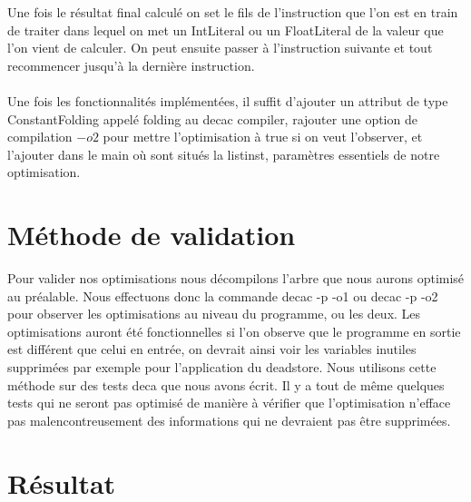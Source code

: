 \documentclass[a4paper]{article}
\begin{document}
Une fois le résultat final calculé on set le fils de l'instruction que l'on est en train de traiter dans lequel on met un IntLiteral ou un FloatLiteral de la valeur que l'on vient de calculer. On peut ensuite passer à l'instruction suivante et tout recommencer jusqu'à la dernière instruction.\\ \\
Une fois les fonctionnalités implémentées, il suffit d'ajouter un attribut de type ConstantFolding appelé folding au decac compiler, rajouter une option de compilation $-o2$ pour mettre l'optimisation à true si on veut l'observer, et l'ajouter dans le main où sont situés la listinst, paramètres essentiels de notre optimisation.

\section{Méthode de validation}
Pour valider nos optimisations nous décompilons l'arbre que nous aurons optimisé au préalable. Nous effectuons donc la commande decac -p -o1 ou decac -p -o2 pour observer les optimisations au niveau du programme, ou les deux.
Les optimisations auront été fonctionnelles si l'on observe que le programme en sortie est différent que celui en entrée, on devrait ainsi voir les variables inutiles supprimées par exemple pour l'application du deadstore. Nous utilisons cette méthode sur des tests deca que nous avons écrit. Il y a tout de même quelques tests qui ne seront pas optimisé de manière à vérifier que l'optimisation n'efface pas malencontreusement des informations qui ne devraient pas être supprimées.
\section{Résultat}
\end{document}
